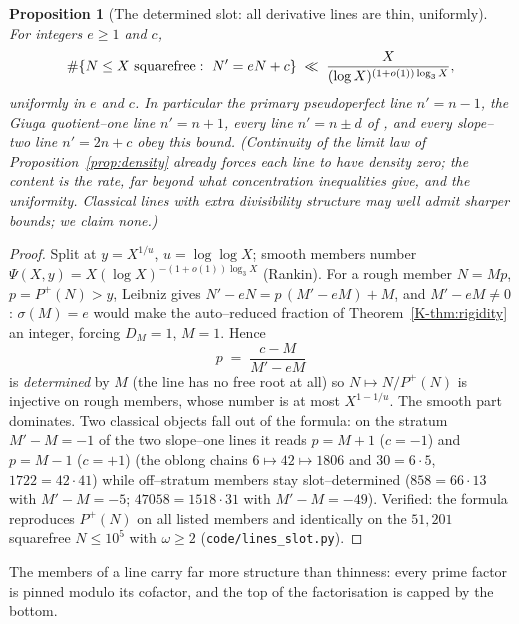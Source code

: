 \documentclass[11pt]{article}
\newtheorem{proposition}[theorem]{Proposition}
\theoremstyle{definition}
\begin{document}
\begin{proposition}[The determined slot: all derivative lines are thin, uniformly]\label{prop:lines}
For integers $e\ge1$ and $c$,
\[ \#\{N\le X\ \textnormal{squarefree}:\ N'=eN+c\}\;\ll\;\frac{X}{(\log X)^{(1+o(1))\log_3X}}, \]
uniformly in $e$ and $c$. In particular the primary pseudoperfect line $n'=n-1$, the Giuga
quotient--one line $n'=n+1$, every line $n'=n\pm d$ of
\cite{GrauOllerMarcenSadornil2021}, and every slope--two line $n'=2n+c$ obey this bound.
(Continuity of the limit law of Proposition~\ref{prop:density} already forces each line to have
density zero; the content is the rate, far beyond what concentration inequalities give, and the
uniformity. Classical lines with extra divisibility structure may well admit sharper bounds; we
claim none.)
\end{proposition}
\begin{proof}
Split at $y=X^{1/u}$, $u=\log\log X$; smooth members number
$\Psi(X,y)=X(\log X)^{-(1+o(1))\log_3X}$ (Rankin). For a rough member $N=Mp$, $p=P^+(N)>y$,
Leibniz gives $N'-eN=p\,(M'-eM)+M$, and $M'-eM\ne0$: $\sigma(M)=e$ would make the auto--reduced
fraction of Theorem~\ref{K-thm:rigidity} an integer, forcing $D_M=1$, $M=1$. Hence
\[ p\;=\;\frac{c-M}{M'-eM} \]
is \emph{determined} by $M$ (the line has no free root at all) so $N\mapsto N/P^+(N)$ is
injective on rough members, whose number is at most $X^{1-1/u}$. The smooth part dominates.
Two classical objects fall out of the formula: on the stratum $M'-M=-1$ of the two slope--one
lines it reads $p=M+1$ ($c=-1$) and $p=M-1$ ($c=+1$) (the oblong chains
$6\mapsto42\mapsto1806$ and $30=6\cdot5$, $1722=42\cdot41$) while off--stratum members stay
slot--determined ($858=66\cdot13$ with $M'-M=-5$; $47058=1518\cdot31$ with $M'-M=-49$). Verified:
the formula reproduces $P^+(N)$ on all listed members and identically on the $51{,}201$ squarefree
$N\le10^5$ with $\omega\ge2$ (\texttt{code/lines\_slot.py}).
\end{proof}

The members of a line carry far more structure than thinness: every prime factor is pinned modulo
its cofactor, and the top of the factorisation is capped by the bottom.
\end{document}

